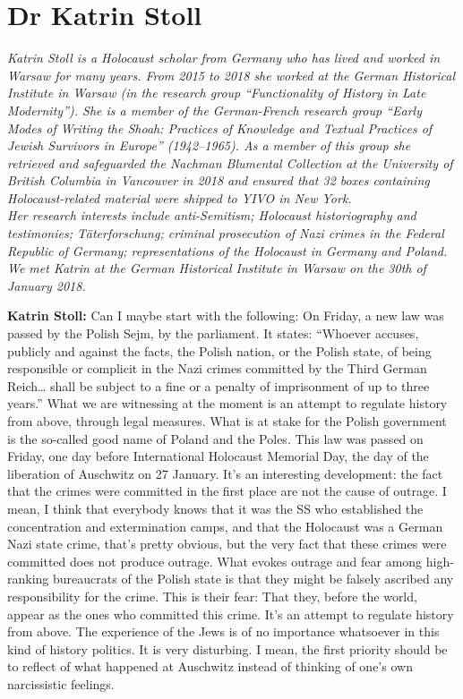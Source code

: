\section{Dr Katrin Stoll} 

\textit{Katrin Stoll is a Holocaust scholar from Germany who has lived and worked in Warsaw for many years. From 2015 to 2018 she worked at the German Historical Institute in Warsaw (in the research group "`Functionality of History in Late Modernity"'). She is a member of the German-French research group "`Early Modes of Writing the Shoah: Practices of Knowledge and Textual Practices of Jewish Survivors in Europe"' (1942–1965). As a member of this group she retrieved and safeguarded the Nachman Blumental Collection at the University of British Columbia in Vancouver in 2018 and ensured that 32 boxes containing Holocaust-related material were shipped to YIVO in New York. \\
Her research interests include anti-Semitism; Holocaust historiography and testimonies; Täterforschung; criminal prosecution of Nazi crimes in the Federal Republic of Germany; representations of the Holocaust in Germany and Poland. \\
We met Katrin at the German Historical Institute in Warsaw on the 30th of January 2018.}\par 
\vspace*{2em}
\textbf{Katrin Stoll:} Can I maybe start with the following: On Friday, a new law was passed by the Polish Sejm, by the parliament. It states: "`Whoever accuses, publicly and against the facts, the Polish nation, or the Polish state, of being responsible or complicit in the Nazi crimes committed by the Third German Reich… shall be subject to a fine or a penalty of imprisonment of up to three years."' What we are witnessing at the moment is an attempt to regulate history from above, through legal measures.  What is at stake for the Polish government is the so-called good name of Poland and the Poles. This law was passed on Friday, one day before International Holocaust Memorial Day, the day of the liberation of Auschwitz on 27 January. It’s an interesting development: the fact that the crimes were committed in the first place are not the cause of outrage. I mean, I think that everybody knows that it was the SS who established the concentration and extermination camps, and that the Holocaust was a German Nazi state crime, that’s pretty obvious, but the very fact that these crimes were committed does not produce outrage. What evokes outrage and fear among high-ranking bureaucrats of the Polish state is that they might be falsely ascribed any responsibility for the crime. This is their fear: That they, before the world, appear as the ones who committed this crime. It’s an attempt to regulate history from above. The experience of the Jews is of no importance whatsoever in this kind of history politics. It is very disturbing. I mean, the first priority should be to reflect of what happened at Auschwitz instead of thinking of one’s own narcissistic feelings. 

